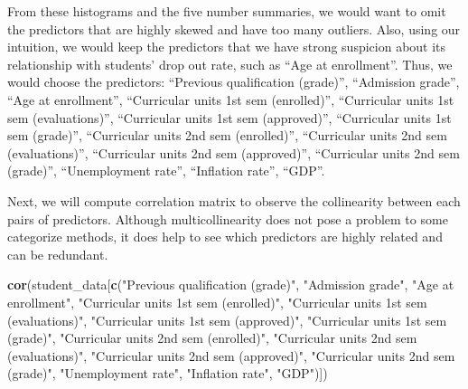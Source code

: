 \documentclass[
]{article}
\newenvironment{Shaded}{\begin{snugshade}}{\end{snugshade}}
\newcommand{\FunctionTok}[1]{\textcolor[rgb]{0.13,0.29,0.53}{\textbf{#1}}}
\newcommand{\NormalTok}[1]{#1}
\newcommand{\StringTok}[1]{\textcolor[rgb]{0.31,0.60,0.02}{#1}}
\begin{document}
From these histograms and the five number summaries, we would want to
omit the predictors that are highly skewed and have too many outliers.
Also, using our intuition, we would keep the predictors that we have
strong suspicion about its relationship with students' drop out rate,
such as ``Age at enrollment''. Thus, we would choose the predictors:
``Previous qualification (grade)'', ``Admission grade'', ``Age at
enrollment'', ``Curricular units 1st sem (enrolled)'', ``Curricular
units 1st sem (evaluations)'', ``Curricular units 1st sem (approved)'',
``Curricular units 1st sem (grade)'', ``Curricular units 2nd sem
(enrolled)'', ``Curricular units 2nd sem (evaluations)'', ``Curricular
units 2nd sem (approved)'', ``Curricular units 2nd sem (grade)'',
``Unemployment rate'', ``Inflation rate'', ``GDP''.

Next, we will compute correlation matrix to observe the collinearity
between each pairs of predictors. Although multicollinearity does not
pose a problem to some categorize methods, it does help to see which
predictors are highly related and can be redundant.

\begin{Shaded}
\begin{Highlighting}[]
\FunctionTok{cor}\NormalTok{(student\_data[}\FunctionTok{c}\NormalTok{(}\StringTok{"Previous qualification (grade)"}\NormalTok{, }\StringTok{"Admission grade"}\NormalTok{, }\StringTok{"Age at enrollment"}\NormalTok{, }\StringTok{"Curricular units 1st sem (enrolled)"}\NormalTok{, }\StringTok{"Curricular units 1st sem (evaluations)"}\NormalTok{, }\StringTok{"Curricular units 1st sem (approved)"}\NormalTok{,  }\StringTok{"Curricular units 1st sem (grade)"}\NormalTok{, }\StringTok{"Curricular units 2nd sem (enrolled)"}\NormalTok{, }\StringTok{"Curricular units 2nd sem (evaluations)"}\NormalTok{, }\StringTok{"Curricular units 2nd sem (approved)"}\NormalTok{, }\StringTok{"Curricular units 2nd sem (grade)"}\NormalTok{, }\StringTok{"Unemployment rate"}\NormalTok{, }\StringTok{"Inflation rate"}\NormalTok{, }\StringTok{"GDP"}\NormalTok{)])}
\end{Highlighting}
\end{Shaded}
\end{document}

